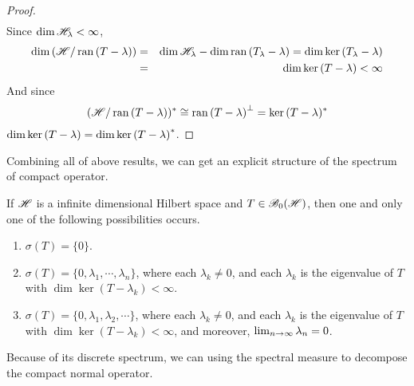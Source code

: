 \begin{proof}
\begin{eqnarray*}
	\end{eqnarray*}
	Since $\dim{\mathscr{H}_{\lambda}} < \infty$,
	\begin{eqnarray*}
		\dim{(\mathscr{H}/ \operatorname{ran}{(T-\lambda)})} &=& \dim{\mathscr{H}_{\lambda}} - \dim{\operatorname{ran}{(T_{\lambda}-\lambda)}} = \dim{\ker{(T_{\lambda}-\lambda)}} \\
		&=& \dim{\ker{(T-\lambda)}} < \infty
	\end{eqnarray*}
	And since
	\begin{equation*}
		(\mathscr{H} / \operatorname{ran}{(T-\lambda)})^{*} \cong \operatorname{ran}{(T-\lambda)}^{\bot} = \ker{(T-\lambda)^{*}}
	\end{equation*}
	$\dim{\ker{(T-\lambda)}} = \dim{\ker{(T-\lambda)}^{*}}$.
\end{proof}

Combining all of above results, we can get an explicit structure of the spectrum of compact operator.

\begin{thm}[Riesz]
	If $\mathscr{H}$ is a infinite dimensional Hilbert space and $T \in \mathscr{B}_{0}\mathscr{(H)}$, then one and only one of the following possibilities occurs.
	\begin{enumerate}[label=\arabic*)]
		\item $\sigma(T) = \{0\}$.
		\item $\sigma(T) = \{0,\lambda_1,\cdots,\lambda_n\}$, where each $\lambda_k \neq 0$, and each $\lambda_k$ is the eigenvalue of $T$ with $\dim{\ker{(T-\lambda_k)}}<\infty$.
		\item $\sigma(T) = \{0,\lambda_1,\lambda_2,\cdots\}$, where each $\lambda_k \neq 0$, and each $\lambda_k$ is the eigenvalue of $T$ with $\dim{\ker{(T-\lambda_k)}}<\infty$, and moreover, $\lim_{n \rightarrow \infty} \lambda_n =0$.
	\end{enumerate}
\end{thm}

Because of its discrete spectrum, we can using the spectral measure to decompose the compact normal operator.


